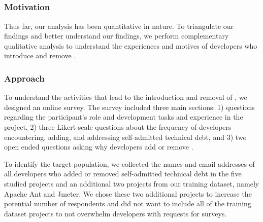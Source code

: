 \subsection*{\rqiv}

\subsubsection*{Motivation} 
Thus far, our analysis has been quantitative in nature. To triangulate our findings and better understand our findings, we perform complementary qualitative analysis to understand the experiences and motives of developers who introduce and remove \SATD.


 
\subsubsection*{Approach} 
To understand the activities that lead to the introduction and removal of \SATD, we designed an online survey. The survey included three main sections: 1)  questions regarding the participant's role and development tasks and experience in the project, 2) three Likert-scale questions about the frequency of developers encountering, adding, and addressing self-admitted technical debt, and 3) two open ended questions asking why developers add or remove \SATD. 

To identify the target population, we collected the names and email addresses of all developers who added or removed self-admitted technical debt in the five studied projects and an additional two projects from our training dataset, namely Apache Ant and Jmeter. We chose these two additional projects to increase the potential number of respondents and did not want to include all of the training dataset projects to not overwhelm developers with requests for surveys.

